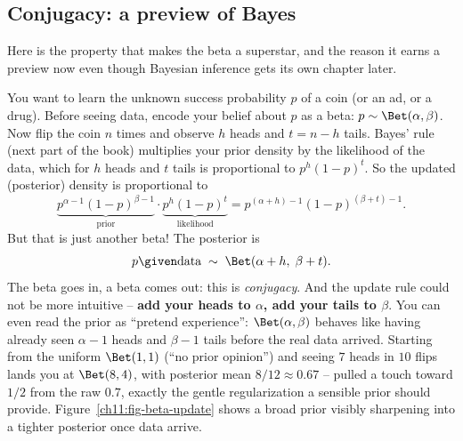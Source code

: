 \subsection{Conjugacy: a preview of Bayes}
\label{ch11:conjugacy}

Here is the property that makes the beta a superstar, and the reason it earns a
preview now even though Bayesian inference gets its own chapter later.

\begin{applicationbox}
You want to learn the unknown success probability $p$ of a coin (or an ad, or a
drug). Before seeing data, encode your belief about $p$ as a beta:
$p \sim \Bet(\alpha,\beta)$. Now flip the coin $n$ times and observe $h$ heads
and $t = n-h$ tails. Bayes' rule (next part of the book) multiplies your prior
density by the likelihood of the data, which for $h$ heads and $t$ tails is
proportional to $p^{h}(1-p)^{t}$. So the updated (posterior) density is
proportional to
\[
  \underbrace{p^{\alpha-1}(1-p)^{\beta-1}}_{\text{prior}} \cdot
  \underbrace{p^{h}(1-p)^{t}}_{\text{likelihood}}
  = p^{(\alpha+h)-1}(1-p)^{(\beta+t)-1}.
\]
But that is just another beta! The posterior is
\[
  p \given \text{data} \;\sim\; \Bet(\alpha + h,\; \beta + t).
\]
The beta goes in, a beta comes out: this is \emph{conjugacy}. And the update rule
could not be more intuitive -- \textbf{add your heads to $\alpha$, add your tails
to $\beta$}. You can even read the prior as ``pretend experience'': $\Bet(\alpha,
\beta)$ behaves like having already seen $\alpha-1$ heads and $\beta-1$ tails
before the real data arrived. Starting from the uniform $\Bet(1,1)$ (``no prior
opinion'') and seeing $7$ heads in $10$ flips lands you at $\Bet(8,4)$, with
posterior mean $8/12 \approx 0.67$ -- pulled a touch toward $1/2$ from the raw
$0.7$, exactly the gentle regularization a sensible prior should provide.
Figure~\ref{ch11:fig-beta-update} shows a broad prior visibly sharpening into a
tighter posterior once data arrive.
\end{applicationbox}

